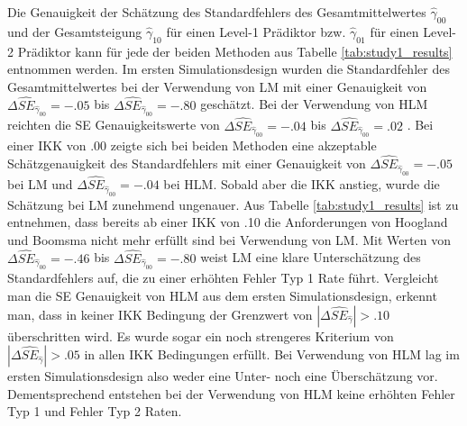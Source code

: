 \documentclass[12pt]{article}\usepackage[]{graphicx}\usepackage[]{color}
\begin{document}
Die Genauigkeit der Schätzung des Standardfehlers des Gesamtmittelwertes $\widehat{\gamma}_{00}$ und der Gesamtsteigung $\widehat{\gamma}_{10}$ für einen Level-1 Prädiktor bzw. $\widehat{\gamma}_{01}$ für einen Level-2 Prädiktor kann für jede der beiden Methoden aus Tabelle \ref{tab:study1_results} entnommen werden. Im ersten Simulationsdesign wurden die Standardfehler des Gesamtmittelwertes bei der Verwendung von LM mit einer Genauigkeit von $\Delta\widehat{SE}_{\widehat{\gamma}_{00}} = -.05$ bis $\Delta\widehat{SE}_{\widehat{\gamma}_{00}} = -.80$ geschätzt. Bei der Verwendung von HLM reichten die SE Genauigkeitswerte von $\Delta\widehat{SE}_{\widehat{\gamma}_{00}} = -.04$ bis $\Delta\widehat{SE}_{\widehat{\gamma}_{00}} = .02$ . Bei einer IKK von .00 zeigte sich bei beiden Methoden eine akzeptable Schätzgenauigkeit des Standardfehlers mit einer Genauigkeit von $\Delta\widehat{SE}_{\widehat{\gamma}_{00}} = -.05$ bei LM und $\Delta\widehat{SE}_{\widehat{\gamma}_{00}} = -.04$ bei HLM. Sobald aber die IKK anstieg, wurde die Schätzung bei LM zunehmend ungenauer. Aus Tabelle \ref{tab:study1_results} ist zu entnehmen, dass bereits ab einer IKK von .10 die Anforderungen von Hoogland und Boomsma \citeyearpar{hooglandboosma1998robustness} nicht mehr erfüllt sind bei Verwendung von LM. Mit Werten von $\Delta\widehat{SE}_{\widehat{\gamma}_{00}} = -.46$ bis $\Delta\widehat{SE}_{\widehat{\gamma}_{00}} = -.80$ weist LM eine klare Unterschätzung des Standardfehlers auf, die zu einer erhöhten Fehler Typ 1 Rate führt. Vergleicht man die SE Genauigkeit von HLM aus dem ersten Simulationsdesign, erkennt man, dass in keiner IKK Bedingung der Grenzwert von $|\Delta\widehat{SE}_{\widehat{\gamma}}| > .10$ überschritten wird. Es wurde sogar ein noch strengeres Kriterium von $|\Delta\widehat{SE}_{\widehat{\gamma}}| > .05$ in allen IKK Bedingungen erfüllt. Bei Verwendung von HLM lag im ersten Simulationsdesign also weder eine Unter- noch eine Überschätzung vor. Dementsprechend entstehen bei der Verwendung von HLM keine erhöhten Fehler Typ 1 und Fehler Typ 2 Raten.
\end{document}
